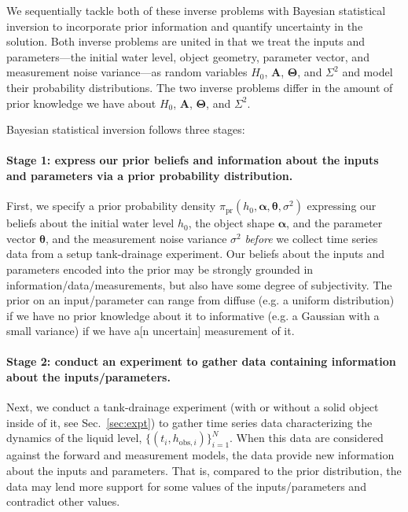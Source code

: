 \documentclass[openacc]{rsproca_new}%
\newcommand\thedata {$\{(t_i,h_{\text{obs}, i})\}_{i=1}^{N}$\xspace}
\begin{document}
We sequentially tackle both of these inverse problems with Bayesian statistical inversion \cite{calvetti2018inverse,waqar2023tutorial,kaipio2006statistical,dashti2013bayesian} to incorporate prior information and quantify uncertainty in the solution. 
Both inverse problems are united in that we treat the inputs and parameters---the initial water level, object geometry, parameter vector, and measurement noise variance---as random variables $H_0$, $\boldsymbol A$, $\boldsymbol \Theta$, and $\Sigma^2$ and model their probability distributions. The two inverse problems differ in the amount of prior knowledge we have about $H_0$, $\boldsymbol A$, $\boldsymbol \Theta$, and $\Sigma^2$.

Bayesian statistical inversion \cite{calvetti2018inverse,waqar2023tutorial,kaipio2006statistical}  follows three stages:

\vspace{-\baselineskip}
\paragraph{Stage 1: express our prior beliefs and information about the inputs and parameters via a prior probability distribution.}
First, we specify a prior probability density $\pi_{\text{pr}}(h_0, \boldsymbol \alpha, \boldsymbol \theta, \sigma^2)$ expressing our beliefs about the initial water level $h_0$, the object shape $\boldsymbol \alpha$, and the parameter vector $\boldsymbol \theta$, and the measurement noise variance $\sigma^2$ \emph{before} we collect time series data from a setup tank-drainage experiment.
Our beliefs about the inputs and parameters encoded into the prior may be strongly grounded in information/data/measurements, but also have some degree of subjectivity.
The prior on an input/parameter can range from diffuse (e.g. a uniform distribution) if we have no prior knowledge about it to informative (e.g. a Gaussian with a small variance) if we have a[n uncertain] measurement of it. \cite{van2021bayesian}

\vspace{-\baselineskip}
\paragraph{Stage 2: conduct an experiment to gather data containing information about the inputs/parameters.}
Next, we conduct a tank-drainage experiment (with or without a solid object inside of it, see Sec.~\ref{sec:expt}) to gather time series data characterizing the dynamics of the liquid level, \thedata. When this data are considered against the forward and measurement models, the data provide new information about the inputs and parameters. 
That is, compared to the prior distribution, the data may lend more support for some values of the inputs/parameters and contradict other values.
\end{document}
